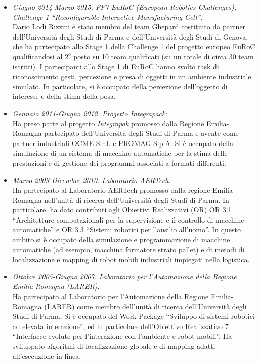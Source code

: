 \documentclass[11pt]{article}
\newcommand{\ITEMDATE}[1]{\item \textit{#1:}\\}
\begin{document}
\begin{itemize}
\ITEMDATE{Giugno 2014-Marzo 2015. FP7 EuRoC (European Robotics Challenges), \\
           Challenge 1 ``Reconfigurable Interactive Manufacturing Cell''} 
Dario Lodi Rizzini \`e stato membro del team Ghepard costituito da partner dell'Universit\`a degli 
Studi di Parma e dell'Universit\`a degli Studi di Genova, che ha partecipato allo Stage 1 della 
Challenge 1 del progetto europeo EuRoC qualificandosi al $2^o$ posto su 10 team qualificati 
(su un totale di circa 30 team iscritti).
I partecipanti allo Stage 1 di EuRoC hanno svolto task di riconoscimento gesti, percezione e presa 
di oggetti in un ambiente industriale simulato. 
In particolare, si \`e occupato della percezione dell'oggetto di interesse e della stima della posa.

\ITEMDATE{Gennaio 2011-Giugno 2012. Progetto Integrapack} 
Ha preso parte al progetto \emph{Integrapak} promosso dalla Regione Emilia-Romagna partecipato 
dell'Universit\`a degli Studi di Parma
e avente come partner industriali OCME S.r.l. e PROMAG S.p.A.
Si \`e occupato della simulazione di un sistema di macchine automatiche per la stima delle prestazioni
e di gestione dei programmi associati a formati differenti. 

\ITEMDATE{Marzo 2009-Dicembre 2010. Laboratorio AERTech}
Ha partecipato al Laboratorio AERTech promosso dalla regione Emilia-Romagna nell'unit\`a di ricerca
dell'Universit\`a degli Studi di Parma.
In particolare, ha dato contributi agli Obiettivi Realizzativi (OR)
OR 3.1 ``Architetture computazionali per la supervisione e il controllo di macchine automatiche'' e
OR 3.3 ``Sistemi robotici per l'ausilio all'uomo''.
In questo ambito si \`e occupato della simulazione e programmazione di macchine automatiche 
(ad esempio, macchina formatore strato pallet) e di metodi di localizzazione e mapping 
di robot mobili industriali impiegati nella logistica. 

\ITEMDATE{Ottobre 2005-Giugno 2007. Laboratorio per l'Automazione della Regione Emilia-Romagna (LARER)}
Ha partecipato al Laboratorio per l'Automazione della Regione Emilia-Romagna (LARER) 
come membro dell'unit\`a di ricerca dell'Universit\`a degli Studi di Parma.
Si \`e occupato del Work Package ``Sviluppo di sistemi robotici ad elevata interazione'',
ed in particolare dell'Obiettivo Realizzativo 7 ``Interfacce evolute per l'interazione con l'ambiente e robot mobili''.
Ha sviluppato algoritmi di localizzazione globale e di mapping adatti all'esecuzione in linea.

\end{itemize}
\end{document}
